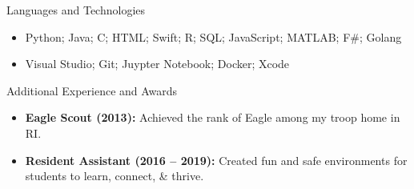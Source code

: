 \documentclass[]{mcdowellcv}
\begin{document}
	\begin{cvsection}{Languages and Technologies}
		\begin{cvsubsection}{}{}{}	
			\begin{itemize}
				\item Python; Java; C; HTML; Swift; R; SQL; JavaScript; MATLAB; F\#; Golang
				\item Visual Studio; Git; Juypter Notebook; Docker; Xcode
			\end{itemize}
		\end{cvsubsection}
	\end{cvsection}

	\begin{cvsection}{Additional Experience and Awards}
		\begin{cvsubsection}{}{}{}	
			\begin{itemize}
				\item \textbf{Eagle Scout (2013):} Achieved the rank of Eagle among my troop home in RI.
				\item \textbf{Resident Assistant (2016 -- 2019):} Created fun and safe environments for students to learn, connect, \& thrive.
			\end{itemize}
		\end{cvsubsection}
	\end{cvsection}
		
\end{document}
